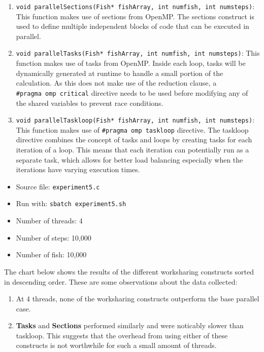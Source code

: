 \documentclass[
]{article}
\providecommand{\tightlist}{%
  \setlength{\itemsep}{0pt}\setlength{\parskip}{0pt}}
\begin{document}
\begin{enumerate}
\def\labelenumi{\arabic{enumi}.}
\item
  \texttt{void\ parallelSections(Fish*\ fishArray,\ int\ numfish,\ int\ numsteps)}:
  This function makes use of sections from OpenMP. The sections
  construct is used to define multiple independent blocks of code that
  can be executed in parallel.
\item
  \texttt{void\ parallelTasks(Fish*\ fishArray,\ int\ numfish,\ int\ numsteps)}:
  This function makes use of tasks from OpenMP. Inside each loop, tasks
  will be dynamically generated at runtime to handle a small portion of
  the calculation. As this does not make use of the reduction clause, a
  \texttt{\#pragma\ omp\ critical} directive needs to be used before
  modifying any of the shared variables to prevent race conditions.
\item
  \texttt{void\ parallelTaskloop(Fish*\ fishArray,\ int\ numfish,\ int\ numsteps)}:
  This function makes use of \texttt{\#pragma\ omp\ taskloop} directive.
  The taskloop directive combines the concept of tasks and loops by
  creating tasks for each iteration of a loop. This means that each
  iteration can potentially run as a separate task, which allows for
  better load balancing especially when the iterations have varying
  execution times.
\end{enumerate}

\begin{itemize}
\tightlist
\item
  Source file: \texttt{experiment5.c}
\item
  Run with: \texttt{sbatch\ experiment5.sh}
\item
  Number of threads: 4
\item
  Number of steps: 10,000
\item
  Number of fish: 10,000
\end{itemize}

The chart below shows the results of the different worksharing
constructs sorted in descending order. These are some observations about
the data collected:

\begin{enumerate}
\def\labelenumi{\arabic{enumi}.}
\item
  At 4 threads, none of the worksharing constructs outperform the base
  parallel case.
\item
  \textbf{Tasks} and \textbf{Sections} performed similarly and were
  noticably slower than taskloop. This suggests that the overhead from
  using either of these constructs is not worthwhile for such a small
  amount of threads.
\end{enumerate}
\end{document}
